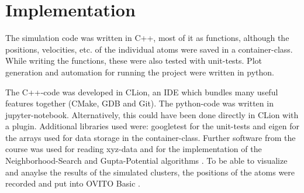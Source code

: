 \chapter{Implementation}
\begin{comment}	
	go about structure of the code 
	-> describe Code structure
		
	-> c++ was used to implement the code (mostly functional)
	-> key atoms container Class which holdes all the Values
	-> most functions were tested with googleTest
\end{comment}

\begin{comment}
code written in c++ most of it pretty functional, classes just used 
for the atoms container which holds the arrays 
while writing it also wrote the unittests with googletest
data aquiered form the code plotted with python
also where large simulations had to be run, called the program from the python code

\end{comment}
The simulation code was written in C++, most of it as functions, although the positions, velocities, etc. of the individual atoms were saved in a container-class.
While writing the functions, these were also tested with unit-tests.
Plot generation and automation for running the project were written in python.

\begin{comment}
developed in CLion which as an integrated git inviroment
Clion builds with Cmake then clang as a compiler
debugger is gdb(nicely hidden)
- additianal bibs where :
	googletest	for unittests
	eigen		for arrays 
- software used form the class itself 
- ovito for visualization
\end{comment}
The C++-code was developed in CLion, an IDE which bundles many useful features together (CMake, GDB and Git)\cite{clion}.
The python-code was written in jupyter-notebook. Alternatively, this could have been done directly in CLion with a plugin. 
Additional libraries used were: googletest \cite{googletest} for the unit-tests and eigen \cite{eigen} for the arrays used for data storage in the container-class. 
Further software from the course was used for reading xyz-data and for the implementation of the Neighborhood-Search and Gupta-Potential algorithms \cite{molDymCourse}. 
To be able to visualize and anaylse the results of the simulated clusters, the positions of the atoms were recorded and put into OVITO Basic \cite{ovito}.  

